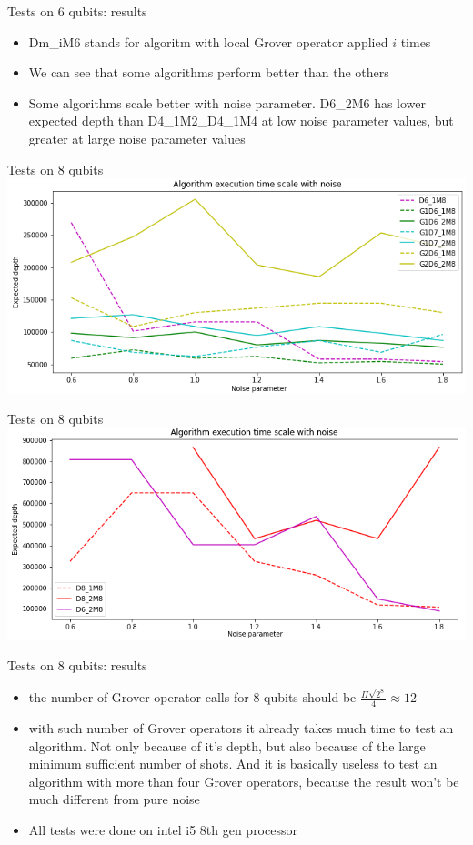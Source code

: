 \documentclass[14pt,aspectratio=169,hyperref={pdftex,unicode},xcolor=dvipsnames]{beamer}
\begin{document}
\begin{frame}{Tests on 6 qubits: results}
	\begin{itemize}
		\item Dm\_iM6 stands for algoritm with local Grover operator applied $i$ times
		\item We can see that some algorithms perform better than the others
		\item Some algorithms scale better with noise parameter. D6\_2M6 has lower expected depth than D4\_1M2\_D4\_1M4 at low noise parameter values, but greater at large noise parameter values
	\end{itemize}
\end{frame}

\begin{frame}{Tests on 8 qubits}
		\includegraphics[width=14cm]{images/8_qubit_tests1.png}
\end{frame}

\begin{frame}{Tests on 8 qubits}
	\includegraphics[width=14cm]{images/8_qubit_tests2.png}
\end{frame}

\begin{frame}{Tests on 8 qubits: results}
	\begin{itemize}	
		\item the number of Grover operator calls for 8 qubits should be ${\frac{\Pi\sqrt{2^8}}{4}} \approx 12$
		\item with such number of Grover operators it already takes much time to test an algorithm. Not only because of it's depth, but also because of the large minimum sufficient number of shots. And it is basically useless to test an algorithm with more than four Grover operators, because the result won't be much different from pure noise
		\item All tests were done on intel i5 8th gen processor 
	\end{itemize}	
\end{frame}
\end{document}

